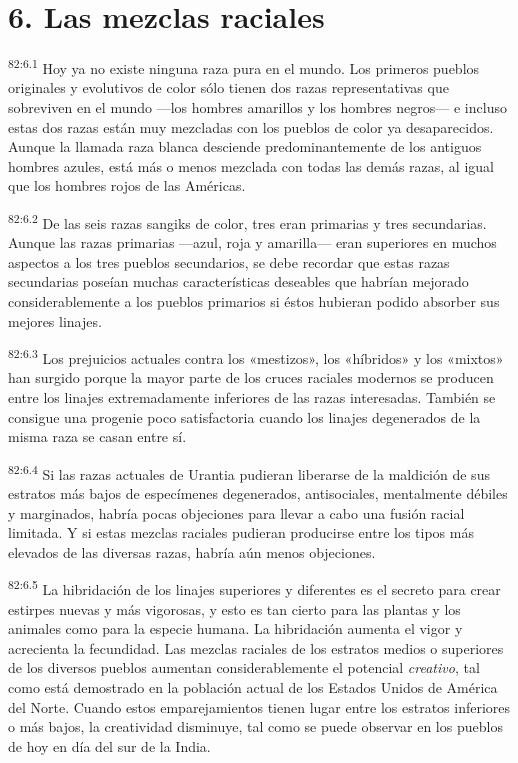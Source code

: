 \section*{6. Las mezclas raciales}
\par
\textsuperscript{82:6.1} Hoy ya no existe ninguna raza pura en el mundo. Los primeros pueblos originales y evolutivos de color sólo tienen dos razas representativas que sobreviven en el mundo ---los hombres amarillos y los hombres negros--- e incluso estas dos razas están muy mezcladas con los pueblos de color ya desaparecidos. Aunque la llamada raza blanca desciende predominantemente de los antiguos hombres azules, está más o menos mezclada con todas las demás razas, al igual que los hombres rojos de las Américas.

\par
\textsuperscript{82:6.2} De las seis razas sangiks de color, tres eran primarias y tres secundarias. Aunque las razas primarias ---azul, roja y amarilla--- eran superiores en muchos aspectos a los tres pueblos secundarios, se debe recordar que estas razas secundarias poseían muchas características deseables que habrían mejorado considerablemente a los pueblos primarios si éstos hubieran podido absorber sus mejores linajes.

\par
\textsuperscript{82:6.3} Los prejuicios actuales contra los «mestizos», los «híbridos» y los «mixtos» han surgido porque la mayor parte de los cruces raciales modernos se producen entre los linajes extremadamente inferiores de las razas interesadas. También se consigue una progenie poco satisfactoria cuando los linajes degenerados de la misma raza se casan entre sí.

\par
\textsuperscript{82:6.4} Si las razas actuales de Urantia pudieran liberarse de la maldición de sus estratos más bajos de especímenes degenerados, antisociales, mentalmente débiles y marginados, habría pocas objeciones para llevar a cabo una fusión racial limitada. Y si estas mezclas raciales pudieran producirse entre los tipos más elevados de las diversas razas, habría aún menos objeciones.

\par
\textsuperscript{82:6.5} La hibridación de los linajes superiores y diferentes es el secreto para crear estirpes nuevas y más vigorosas, y esto es tan cierto para las plantas y los animales como para la especie humana. La hibridación aumenta el vigor y acrecienta la fecundidad. Las mezclas raciales de los estratos medios o superiores de los diversos pueblos aumentan considerablemente el potencial \textit{creativo}, tal como está demostrado en la población actual de los Estados Unidos de América del Norte. Cuando estos emparejamientos tienen lugar entre los estratos inferiores o más bajos, la creatividad disminuye, tal como se puede observar en los pueblos de hoy en día del sur de la India.

